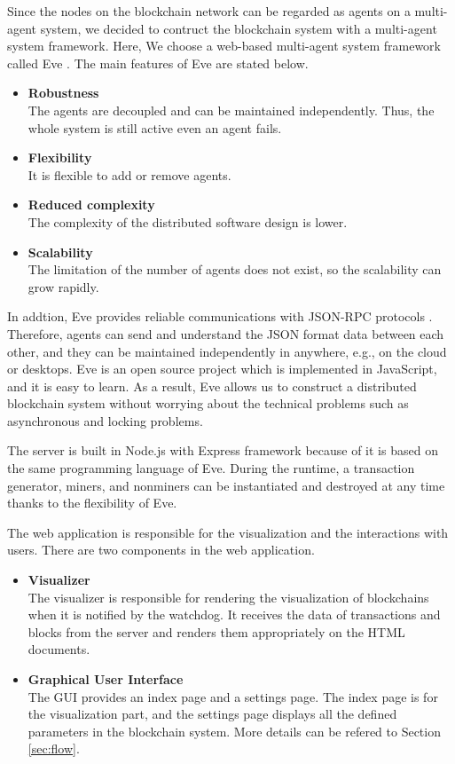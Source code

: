 Since the nodes on the blockchain network can be regarded as agents on a multi-agent system, we decided to contruct the blockchain system with a multi-agent system framework. Here, We choose a web-based multi-agent system framework called Eve \cite{eve}. The main features of Eve are stated below.

\begin{itemize}
    \item \textbf{Robustness} \\
        The agents are decoupled and can be maintained independently. Thus, the whole system is still active even an agent fails.
    \item \textbf{Flexibility} \\
        It is flexible to add or remove agents.
    \item \textbf{Reduced complexity} \\
        The complexity of the distributed software design is lower.
    \item \textbf{Scalability} \\
        The limitation of the number of agents does not exist, so the scalability can grow rapidly.
\end{itemize}

In addtion, Eve provides reliable communications with JSON-RPC protocols \cite{jsonrpc}. Therefore, agents can send and understand the JSON format data between each other, and they can be maintained independently in anywhere, e.g., on the cloud or desktops. Eve is an open source project which is implemented in JavaScript, and it is easy to learn. As a result, Eve allows us to construct a distributed blockchain system without worrying about the technical problems such as asynchronous and locking problems.

The server is built in Node.js with Express framework because of it is based on the same programming language of Eve. During the runtime, a transaction generator, miners, and nonminers can be instantiated and destroyed at any time thanks to the flexibility of Eve.

The web application is responsible for the visualization and the interactions with users. There are two components in the web application.

\begin{itemize}
    \item \textbf{Visualizer} \\
        The visualizer is responsible for rendering the visualization of blockchains when it is notified by the watchdog. It receives the data of transactions and blocks from the server and renders them appropriately on the HTML documents.
    \item \textbf{Graphical User Interface} \\
        The GUI provides an index page and a settings page. The index page is for the visualization part, and the settings page displays all the defined parameters in the blockchain system. More details can be refered to Section \ref{sec:flow}.
\end{itemize}

